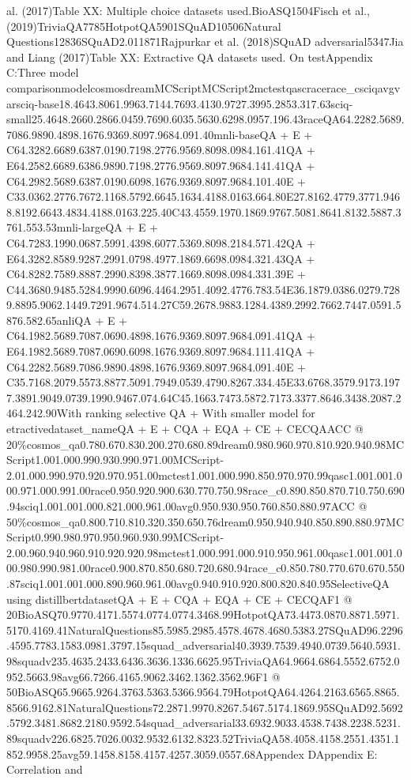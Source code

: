 \documentclass{scrbook}
\begin{document}
al. (2017)Table XX: Multiple choice datasets used.BioASQ1504Fisch et al.,(2019)TriviaQA7785HotpotQA5901SQuAD10506Natural Questions12836SQuAD2.011871Rajpurkar et al. (2018)SQuAD adversarial5347Jia and Liang (2017)Table XX: Extractive QA datasets used. On testAppendix C:Three model comparisonmodelcosmosdreamMCScriptMCScript2mctestqascracerace\_csciqavgvarsciq-base18.4643.8061.9963.7144.7693.4130.9727.3995.2853.317.63sciq-small25.4648.2660.2866.0459.7690.6035.5630.6298.0957.196.43raceQA64.2282.5689.7086.9890.4898.1676.9369.8097.9684.091.40mnli-baseQA + E + C64.3282.6689.6387.0190.7198.2776.9569.8098.0984.161.41QA + E64.2582.6689.6386.9890.7198.2776.9569.8097.9684.141.41QA + C64.2982.5689.6387.0190.6098.1676.9369.8097.9684.101.40E + C33.0362.2776.7672.1168.5792.6645.1634.4188.0163.664.80E27.8162.4779.3771.9468.8192.6643.4834.4188.0163.225.40C43.4559.1970.1869.9767.5081.8641.8132.5887.3761.553.53mnli-largeQA + E + C64.7283.1990.0687.5991.4398.6077.5369.8098.2184.571.42QA + E64.3282.8589.9287.2991.0798.4977.1869.6698.0984.321.43QA + C64.8282.7589.8887.2990.8398.3877.1669.8098.0984.331.39E + C44.3680.9485.5284.9990.6096.4464.2951.4092.4776.783.54E36.1879.0386.0279.7289.8895.9062.1449.7291.9674.514.27C59.2678.9883.1284.4389.2992.7662.7447.0591.5876.582.65anliQA + E + C64.1982.5689.7087.0690.4898.1676.9369.8097.9684.091.41QA + E64.1982.5689.7087.0690.6098.1676.9369.8097.9684.111.41QA + C64.2282.5689.7086.9890.4898.1676.9369.8097.9684.091.40E + C35.7168.2079.5573.8877.5091.7949.0539.4790.8267.334.45E33.6768.3579.9173.1977.3891.9049.0739.1990.9467.074.64C45.1663.7473.5872.7173.3377.8646.3438.2087.2464.242.90With ranking selective QA + With smaller model for etractivedataset\_nameQA + E + CQA + EQA + CE + CECQAACC @ 20\%cosmos\_qa0.780.670.830.200.270.680.89dream0.980.960.970.810.920.940.98MCScript1.001.000.990.930.990.971.00MCScript-2.01.000.990.970.920.970.951.00mctest1.001.000.990.850.970.970.99qasc1.001.001.000.971.000.991.00race0.950.920.900.630.770.750.98race\_c0.890.850.870.710.750.690.94sciq1.001.001.000.821.000.961.00avg0.950.930.950.760.850.880.97ACC @ 50\%cosmos\_qa0.800.710.810.320.350.650.76dream0.950.940.940.850.890.880.97MCScript0.990.980.970.950.960.930.99MCScript-2.00.960.940.960.910.920.920.98mctest1.000.991.000.910.950.961.00qasc1.001.001.000.980.990.981.00race0.900.870.850.680.720.680.94race\_c0.850.780.770.670.670.550.87sciq1.001.001.000.890.960.961.00avg0.940.910.920.800.820.840.95SelectiveQA using distillbertdatasetQA + E + CQA + EQA + CE + CECQAF1 @ 20BioASQ70.9770.4171.5574.0774.0774.3468.99HotpotQA73.4473.0870.8871.5971.5170.4169.41NaturalQuestions85.5985.2985.4578.4678.4680.5383.27SQuAD96.2296.4595.7783.1583.0981.3797.15squad\_adversarial40.3939.7539.4940.0739.5640.5931.98squadv235.4635.2433.6436.3636.1336.6625.95TriviaQA64.9664.6864.5552.6752.0952.5663.98avg66.7266.4165.9062.3462.1362.3562.96F1 @ 50BioASQ65.9665.9264.3763.5363.5366.9564.79HotpotQA64.4264.2163.6565.8865.8566.9162.81NaturalQuestions72.2871.9970.8267.5467.5174.1869.95SQuAD92.5692.5792.3481.8682.2180.9592.54squad\_adversarial33.6932.9033.4538.7438.2238.5231.89squadv226.6825.7026.0032.9532.6132.8323.52TriviaQA58.4058.4158.2551.4351.1852.9958.25avg59.1458.8158.4157.4257.3059.0557.68Appendex DAppendix E: Correlation and 
\end{document}
